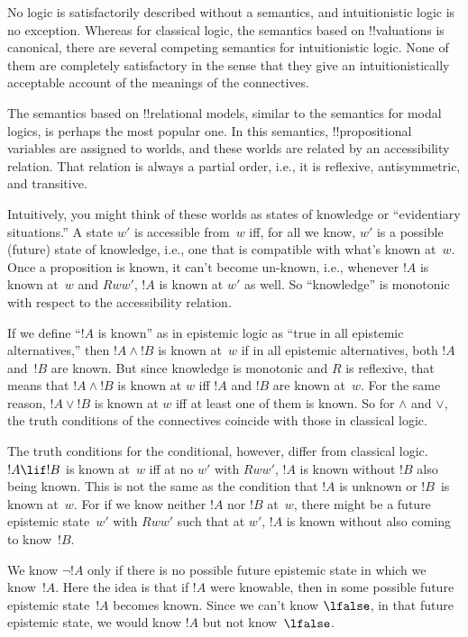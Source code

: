\documentclass[../../../include/open-logic-section]{subfiles}
\begin{document}


No logic is satisfactorily described without a semantics, and
intuitionistic logic is no exception. Whereas for classical logic, the
semantics based on !!{valuation}s is canonical, there are several
competing semantics for intuitionistic logic. None of them are
completely satisfactory in the sense that they give an
intuitionistically acceptable account of the meanings of the
connectives.

The semantics based on !!{relational model}s, similar to the semantics
for modal logics, is perhaps the most popular one.  In this semantics,
!!{propositional variable}s are assigned to worlds, and these worlds
are related by an accessibility relation. That relation is always a
partial order, i.e., it is reflexive, antisymmetric, and
transitive.

Intuitively, you might think of these worlds as states of knowledge or
``evidentiary situations.''  A state $w'$ is accessible from~$w$ iff,
for all we know, $w'$ is a possible (future) state of knowledge, i.e.,
one that is compatible with what's known at~$w$.  Once a proposition
is known, it can't become un-known, i.e., whenever $!A$ is known at~$w$
and $Rww'$, $!A$ is known at $w'$ as well. So ``knowledge'' is
monotonic with respect to the accessibility relation.

If we define ``$!A$ is known'' as in epistemic logic as ``true in all
epistemic alternatives,'' then $!A \land !B$ is known at~$w$ if in all
epistemic alternatives, both $!A$ and~$!B$ are known. But since
knowledge is monotonic and $R$ is reflexive, that means that $!A \land
!B$ is known at $w$ iff $!A$ and $!B$ are known at~$w$.  For the same
reason, $!A \lor !B$ is known at $w$ iff at least one of them is
known. So for $\land$ and $\lor$, the truth conditions of the
connectives coincide with those in classical logic.

The truth conditions for the conditional, however, differ from
classical logic. $!A \lif !B$ is known at~$w$ iff at no $w'$ with
$Rww'$, $!A$ is known without $!B$ also being known. This is not the
same as the condition that $!A$ is unknown or $!B$~is known
at~$w$. For if we know neither $!A$ nor $!B$ at~$w$, there might be a
future epistemic state~$w'$ with $Rww'$ such that at $w'$, $!A$ is
known without also coming to know~$!B$.

We know $\lnot !A$ only if there is no possible future epistemic state
in which we know~$!A$. Here the idea is that if $!A$ were knowable,
then in some possible future epistemic state~$!A$ becomes known. Since
we can't know $\lfalse$, in that future epistemic state, we would know
$!A$ but not know~$\lfalse$.
\end{document}
